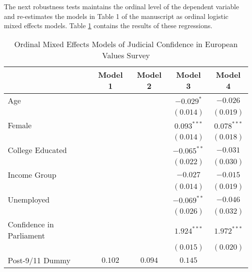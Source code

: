 \documentclass[11pt,]{article}
\begin{document}
The next robustness tests maintains the ordinal level of the dependent
variable and re-estimates the models in Table 1 of the manuscript as
ordinal logistic mixed effects models. Table \ref{tab:ordinaltab}
contains the results of these regressions.

\begin{table}
\begin{center}
\caption{Ordinal Mixed Effects Models of Judicial Confidence in European Values Survey}
\label{tab:ordinaltab}
\begin{tabular}{l c c c c }
\hline
 & Model 1 & Model 2 & Model 3 & Model 4 \\
\hline
Age                                      &                &                & $-0.029^{*}$   & $-0.026$       \\
                                         &                &                & $(0.014)$      & $(0.019)$      \\
Female                                   &                &                & $0.093^{***}$  & $0.078^{***}$  \\
                                         &                &                & $(0.014)$      & $(0.018)$      \\
College Educated                         &                &                & $-0.065^{**}$  & $-0.031$       \\
                                         &                &                & $(0.022)$      & $(0.030)$      \\
Income Group                             &                &                & $-0.027$       & $-0.015$       \\
                                         &                &                & $(0.014)$      & $(0.019)$      \\
Unemployed                               &                &                & $-0.069^{**}$  & $-0.046$       \\
                                         &                &                & $(0.026)$      & $(0.032)$      \\
Confidence in Parliament                 &                &                & $1.924^{***}$  & $1.972^{***}$  \\
                                         &                &                & $(0.015)$      & $(0.020)$      \\
Post-9/11 Dummy                          & $0.102$        & $0.094$        & $0.145$        &                \\

\end{tabular}
\end{center}
\end{table}
\end{document}
